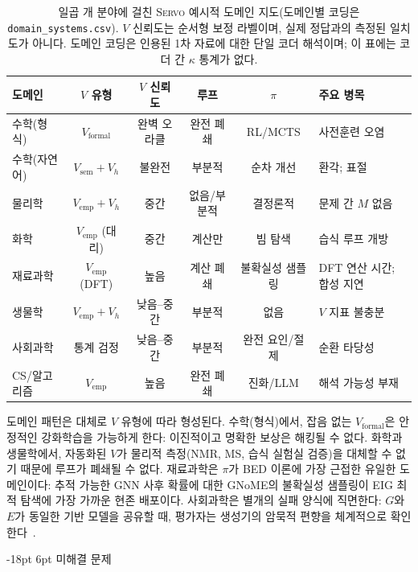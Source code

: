 \documentclass[11pt]{article}
\makeatletter
\renewcommand\section{\@startsection{section}{1}{\z@}%
  {-18pt \@plus -4pt \@minus -2pt}%
  {6pt \@plus 2pt}%
  {\normalfont\large\bfseries}}
\newcommand{\framework}{\textsc{Servo}}
\makeatother
\begin{document}
\begin{table}[h]
\centering
\small
\setlength{\tabcolsep}{4pt}
\begin{tabular}{@{}lccccp{2.6cm}@{}}
\toprule
도메인 & $V$ 유형 & $V$ 신뢰도 & 루프 & $\pi$ & 주요 병목 \\
\midrule
수학(형식) & $V_\text{formal}$ & 완벽 오라클 & 완전 폐쇄 & RL/MCTS  & 사전훈련 오염 \\
수학(자연어) & $V_\text{sem}+V_h$ & 불완전 & 부분적 & 순차 개선 & 환각; 표절 \\
물리학 & $V_\text{emp}+V_h$ & 중간 & 없음/부분적 & 결정론적 & 문제 간 $M$ 없음 \\
화학 & $V_\text{emp}$ (대리) & 중간 & 계산만 & 빔 탐색 & 습식 루프 개방 \\
재료과학 & $V_\text{emp}$ (DFT) & 높음 & 계산 폐쇄 & 불확실성 샘플링 & DFT 연산 시간; 합성 지연 \\
생물학 & $V_\text{emp}+V_h$ & 낮음--중간 & 부분적 & 없음 & $V$ 지표 불충분 \\
사회과학 & 통계 검정 & 낮음--중간 & 부분적 & 완전 요인/절제 & 순환 타당성 \\[3pt]
CS/알고리즘 & $V_\text{emp}$ & 높음 & 완전 폐쇄 & 진화/LLM & 해석 가능성 부재 \\
\bottomrule
\end{tabular}
\caption{일곱 개 분야에 걸친 \framework{} 예시적 도메인 지도(도메인별 코딩은 \texttt{domain\_systems.csv}). $V$ 신뢰도는 순서형 보정 라벨이며, 실제 정답과의 측정된 일치도가 아니다. 도메인 코딩은 인용된 1차 자료에 대한 단일 코더 해석이며; 이 표에는 코더 간 $\kappa$ 통계가 없다.}
\label{tab:domain-comparison}
\end{table}

\noindent 도메인 패턴은 대체로 $V$ 유형에 따라 형성된다. 수학(형식)에서, 잡음 없는 $V_\text{formal}$은 안정적인 강화학습을 가능하게 한다: 이진적이고 명확한 보상은 해킹될 수 없다. 화학과 생물학에서, 자동화된 $V$가 물리적 측정(NMR, MS, 습식 실험실 검증)을 대체할 수 없기 때문에 루프가 폐쇄될 수 없다. 재료과학은 $\pi$가 BED 이론에 가장 근접한 유일한 도메인이다: 추적 가능한 GNN 사후 확률에 대한 GNoME의 불확실성 샘플링이 EIG 최적 탐색에 가장 가까운 현존 배포이다. 사회과학은 별개의 실패 양식에 직면한다: $G$와 $E$가 동일한 기반 모델을 공유할 때, 평가자는 생성기의 암묵적 편향을 체계적으로 확인한다~\citep{aher2023turing}.


\section{미해결 문제}
\label{sec:openproblems}
\end{document}
